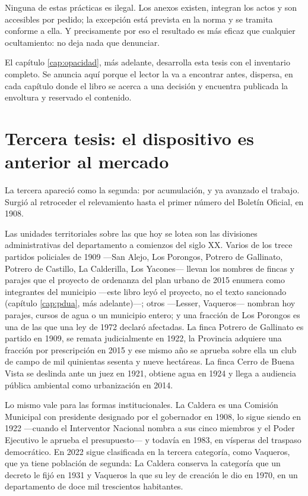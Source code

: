 Ninguna de estas prácticas es ilegal. Los anexos existen, integran los actos y son accesibles por pedido; la excepción está prevista en la norma y se tramita conforme a ella. Y precisamente por eso el resultado es más eficaz que cualquier ocultamiento: no deja nada que denunciar.

El capítulo \ref{cap:opacidad}, más adelante, desarrolla esta tesis con el inventario completo. Se anuncia aquí porque el lector la va a encontrar antes, dispersa, en cada capítulo donde el libro se acerca a una decisión y encuentra publicada la envoltura y reservado el contenido.

\section{Tercera tesis: el dispositivo es anterior al mercado}

La tercera apareció como la segunda: por acumulación, y ya avanzado el trabajo. Surgió al
retroceder el relevamiento hasta el primer número del Boletín Oficial, en 1908.

Las unidades territoriales sobre las que hoy se lotea son las divisiones administrativas
del departamento a comienzos del siglo XX. Varios de los trece partidos policiales de 1909 —San Alejo, Los Porongos, Potrero de Gallinato, Potrero de Castillo, La Calderilla, Los Yacones— llevan los nombres de fincas y parajes que el proyecto de ordenanza del plan urbano de 2015 enumera como integrantes del municipio ---este libro leyó el proyecto, no el texto sancionado (capítulo \ref{cap:pdua}, más adelante)---; otros —Lesser, Vaqueros— nombran hoy parajes, cursos de agua o un municipio entero; y una fracción de Los Porongos es una de las que una ley de 1972 declaró afectadas. La finca Potrero de
Gallinato es partido en 1909, se remata judicialmente en 1922, la Provincia adquiere una
fracción por prescripción en 2015 y ese mismo año se aprueba sobre ella un club de campo de
mil quinientas sesenta y nueve hectáreas. La finca Cerro de Buena Vista se deslinda ante un
juez en 1921, obtiene agua en 1924 y llega a audiencia pública ambiental como urbanización
en 2014.

Lo mismo vale para las formas institucionales. La Caldera es una Comisión Municipal con
presidente designado por el gobernador en 1908, lo sigue siendo en 1922 —cuando el
Interventor Nacional nombra a sus cinco miembros y el Poder Ejecutivo le aprueba el
presupuesto— y todavía en 1983, en vísperas del traspaso democrático. En 2022 sigue
clasificada en la tercera categoría, como Vaqueros, que ya tiene población de segunda: La Caldera conserva la categoría que un decreto le fijó en 1931 y Vaqueros la que su ley de creación le dio en 1970, en un departamento de doce mil trescientos habitantes.


